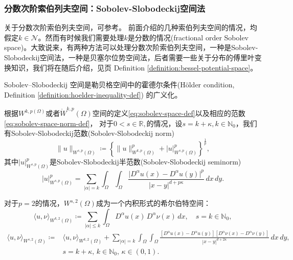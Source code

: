 \subsubsection{分数次阶索伯列夫空间：Sobolev-Slobodeckij空间法}
\label{sec:sobolev-slobodeckij-space}
关于分数次阶索伯列夫空间，可参考\cite{DiNezza:2012wk}。
前面介绍的几种索伯列夫空间的情况，均假定$k \in \mathcal{N}$。然而有时候我们需要处理$k$是分数的情况(fractional order Sobolev space)。大致说来，有两种方法可以处理分数次阶索伯列夫空间，一种是Sobolev-Slobodeckij空间法，一种是贝塞尔位势空间法，后者需要一些关于分布的傅里叶变换知识，我们将在随后介绍，见\pageref{definition:bessel-potential-space}页 Definition \ref{definition:bessel-potential-space}。

Sobolev–Slobodeckij 空间是勒贝格空间中的霍德尔条件(Hölder condition, Definition \ref{definition:hoelder-inequality-def}) 的广义化。

根据$W^{k,p(\Omega)}$或者$\mathring{W}^{k,p}(\Omega)$空间的定义\eqref{eq:sobolev-space-def}以及相应的范数\eqref{eq:sobolev-space-norm-def}，
对于$0 < s \in \mathbb{R}, $的情况，设$s = k + \kappa, k \in \mathbb{N}_0$，我们有Sobolev-Slobodeckij范数(Sobolev-Slobodeckij norm)
\begin{equation*}
  \|u\|_{W^{s,p}(\Omega)} \coloneqq \left\{
  \|u\|^{p}_{W^{k,p}(\Omega)} + \left| u \right|^{p}_{W^{s,p}(\Omega)}
  \right\}^{\frac{1}{p}},
\end{equation*}
其中$\left| u \right|^p_{W^{s,p}(\Omega)}$是Sobolev-Slobodeckij半范数(Sobolev-Slobodeckij seminorm)
\begin{equation*}
  \left| u \right|^p_{W^{s,p}(\Omega)} = \sum_{\left| \alpha \right| = k} \int_{\Omega} \int_{\Omega} \frac{
  \big| D^{\alpha}u(x) - D^{\alpha} u(y) \big|^{p}
  }{
  \big| x - y\big|^{d + p \kappa}
  }\, dx \, dy.
\end{equation*}

对于$p=2$的情况，$W^{s,2}(\Omega)$成为一个内积形式的希尔伯特空间：
\begin{equation}
  \label{eq:sobolev-slobodeckij-innerp-k}
  \langle u,\nu\rangle_{W^{k,2}(\Omega)} \coloneqq \sum_{\left| \alpha \right| \le k} \int_{\Omega} D^{\alpha}u(x) \, D^{\alpha}\nu(x) \, dx, \quad s=k\in \mathbb{N}_0,
\end{equation}
\begin{equation}
  \label{eq:sobolev-slobodeckij-innerp-s}
  \begin{split}
    \langle u,\nu\rangle_{W^{s,2}(\Omega)} \coloneqq & \langle u,\nu\rangle_{W^{k,2}(\Omega)} +
    \sum_{\left| \alpha \right  | = k} \int_{\Omega} \int_{\Omega} \frac{
    \left[D^{\alpha} u(x) - D^{\alpha} u(y) \right]
    \left[D^{\alpha} \nu(x) - D^{\alpha} \nu(y) \right]
    }{
    \left| x - y \right|^{d + 2 \kappa}
    } \, dx \, dy, \\
    & s=k+\kappa, \, k\in \mathbb{N}_0, \, \kappa \in (0,1).
  \end{split}
\end{equation}

